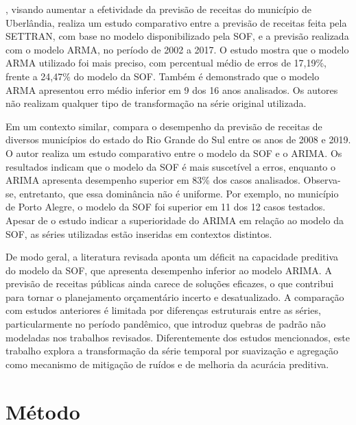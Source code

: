 \documentclass[12pt]{tcc}
\begin{document}
\citet{da_silva_orcamento_2018}, visando aumentar a efetividade da previsão de receitas do município de Uberlândia, realiza um estudo comparativo entre a previsão de receitas feita pela \gls{SETTRAN}, com base no modelo disponibilizado pela \gls{SOF}, e a previsão realizada com o modelo \gls{ARMA}, no período de 2002 a 2017. O estudo mostra que o modelo ARMA utilizado foi mais preciso, com percentual médio de erros de 17,19\%, frente a 24,47\% do modelo da SOF. Também é demonstrado que o modelo ARMA apresentou erro médio inferior em 9 dos 16 anos analisados. Os autores não realizam qualquer tipo de transformação na série original utilizada.

Em um contexto similar, \citet{naibert_orcamento_2021} compara o desempenho da previsão de receitas de diversos municípios do estado do Rio Grande do Sul entre os anos de 2008 e 2019. O autor realiza um estudo comparativo entre o modelo da \gls{SOF} e o \gls{ARIMA}. Os resultados indicam que o modelo da \gls{SOF} é mais suscetível a erros, enquanto o \gls{ARIMA} apresenta desempenho superior em 83\% dos casos analisados. Observa-se, entretanto, que essa dominância não é uniforme. Por exemplo, no município de Porto Alegre, o modelo da \gls{SOF} foi superior em 11 dos 12 casos testados. Apesar de o estudo indicar a superioridade do \gls{ARIMA} em relação ao modelo da \gls{SOF}, as séries utilizadas estão inseridas em contextos distintos.

De modo geral, a literatura revisada aponta um déficit na capacidade preditiva do modelo da \gls{SOF}, que apresenta desempenho inferior ao modelo \gls{ARIMA}. A previsão de receitas públicas ainda carece de soluções eficazes, o que contribui para tornar o planejamento orçamentário incerto e desatualizado. A comparação com estudos anteriores é limitada por diferenças estruturais entre as séries, particularmente no período pandêmico, que introduz quebras de padrão não modeladas nos trabalhos revisados. Diferentemente dos estudos mencionados, este trabalho explora a transformação da série temporal por suavização e agregação como mecanismo de mitigação de ruídos e de melhoria da acurácia preditiva.

\chapter{Método}
\label{sec:metodologia} 
 
\end{document}

